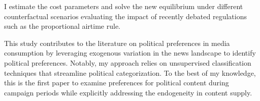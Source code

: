 \documentclass[12pt]{article}
\begin{document}
I estimate the cost parameters and solve the new equilibrium under different counterfactual scenarios evaluating the impact of recently debated regulations such as the proportional airtime rule. 


This study contributes to the literature on political preferences in media consumption by leveraging exogenous variation in the news landscape to identify political preferences. Notably, my approach relies on unsupervised classification techniques that streamline political categorization. To the best of my knowledge, this is the first paper to examine preferences for political content during campaign periods while explicitly addressing the endogeneity in content supply.










\end{document}
